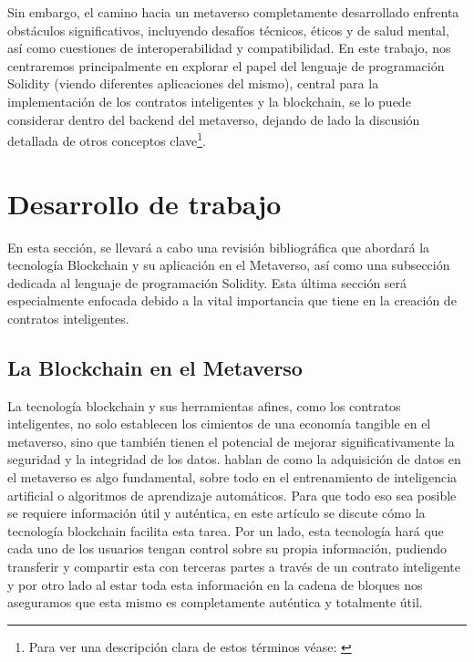 \documentclass[a4paper,10pt]{article}
\begin{document}
	Sin embargo, el camino hacia un metaverso completamente desarrollado enfrenta obstáculos significativos, incluyendo desafíos técnicos, éticos y de salud mental, así como cuestiones de interoperabilidad y compatibilidad.\newline
	En este trabajo, nos centraremos principalmente en explorar el papel del lenguaje de programación Solidity (viendo diferentes aplicaciones del mismo), central para la implementación de los contratos inteligentes y la blockchain, se lo puede considerar dentro del backend del metaverso, dejando de lado la discusión detallada de otros conceptos clave\footnote{Para ver una descripción clara de estos términos véase: \textcite{grandury2022implementacion}}.
	\section{Desarrollo de trabajo}
	En esta sección, se llevará a cabo una revisión bibliográfica que abordará la tecnología Blockchain y su aplicación en el Metaverso, así como una subsección dedicada al lenguaje de programación Solidity. Esta última sección será especialmente enfocada debido a la vital importancia que tiene en la creación de contratos inteligentes.
	\subsection{La Blockchain en el Metaverso}
	La tecnología blockchain y sus herramientas afines, como los contratos inteligentes, no solo establecen los cimientos de una economía tangible en el metaverso, sino que también tienen el potencial de mejorar significativamente la seguridad y la integridad de los datos. \textcite{huynh2023blockchain} hablan de como la adquisición de datos en el metaverso es algo fundamental, sobre todo en el entrenamiento de inteligencia artificial o algoritmos de aprendizaje automáticos. Para que todo eso sea posible se requiere información útil y auténtica, en este artículo se discute cómo la tecnología blockchain facilita esta tarea. Por un lado, esta tecnología hará que cada uno de los usuarios tengan control sobre su propia información, pudiendo transferir y compartir esta con terceras partes a través de un contrato inteligente y por otro lado al estar toda esta información en la cadena de bloques nos aseguramos que esta mismo es completamente auténtica y totalmente útil.
	
\end{document}
